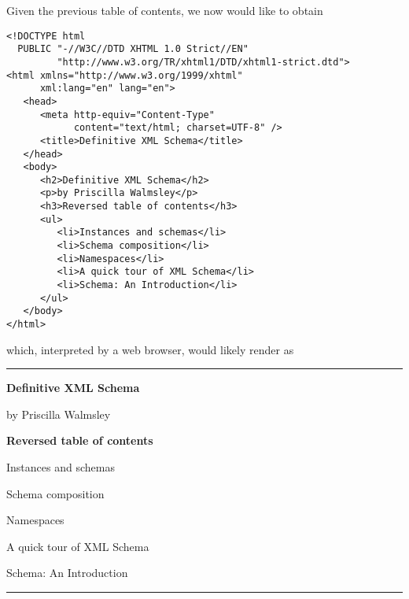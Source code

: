Given the previous table of contents, we now would like to obtain
\begin{verbatim}
<!DOCTYPE html
  PUBLIC "-//W3C//DTD XHTML 1.0 Strict//EN"
         "http://www.w3.org/TR/xhtml1/DTD/xhtml1-strict.dtd">
<html xmlns="http://www.w3.org/1999/xhtml"
      xml:lang="en" lang="en">
   <head>
      <meta http-equiv="Content-Type"
            content="text/html; charset=UTF-8" />
      <title>Definitive XML Schema</title>
   </head>
   <body>
      <h2>Definitive XML Schema</h2>
      <p>by Priscilla Walmsley</p>
      <h3>Reversed table of contents</h3>
      <ul>
         <li>Instances and schemas</li>
         <li>Schema composition</li>
         <li>Namespaces</li>
         <li>A quick tour of XML Schema</li>
         <li>Schema: An Introduction</li>
      </ul>
   </body>
</html>
\end{verbatim}
which, interpreted by a web browser, would likely render as

\noindent\rule{\linewidth}{0.5pt}
\noindent\textbf{\large Definitive XML Schema}

\bigskip

\noindent by Priscilla Walmsley

\bigskip

\noindent\textbf{Reversed table of contents}
\begin{itemize*}

  \item Instances and schemas
  \item Schema composition
  \item Namespaces
  \item A quick tour of XML Schema
  \item Schema: An Introduction

\end{itemize*}
\noindent\rule{\linewidth}{0.5pt}

